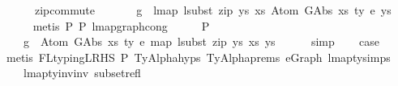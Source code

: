 \begin{isabellebody}
\ \ \ \ \ \ zip{\isacharunderscore}{\kern0pt}commute{\isacharparenright}{\kern0pt}\isanewline
\isanewline
\ \ \isamarkupfalse%
\isanewline
\ \ \ \ {\isachardoublequoteopen}g\ {\isasymsimeq}\ lmap\ {\isacharparenleft}{\kern0pt}lsubst\ {\isacharparenleft}{\kern0pt}zip\ ys{\isacharprime}{\kern0pt}\ xs{\isacharprime}{\kern0pt}{\isacharparenright}{\kern0pt}{\isacharparenright}{\kern0pt}\ {\isacharparenleft}{\kern0pt}Atom\ {\isacharparenleft}{\kern0pt}GAbs\ xs\ ty{}{\isacharprime}{\kern0pt}\ e{\isacharprime}{\kern0pt}{\isacharparenright}{\kern0pt}\ ys{\isacharparenright}{\kern0pt}{\isachardoublequoteclose}\isanewline
\ \ \ \ \isamarkupfalse%
\ {\isacharparenleft}{\kern0pt}metis\ P{}\ P{}\ lmap{\isacharunderscore}{\kern0pt}graph{\isacharunderscore}{\kern0pt}cong{\isacharparenright}{\kern0pt}\isanewline
\ \ \isamarkupfalse%
\ \isamarkupfalse%
\ P{}{\isacharcolon}{\kern0pt}\isanewline
\ \ \ \ {\isachardoublequoteopen}g\ {\isasymsimeq}\ Atom\ {\isacharparenleft}{\kern0pt}GAbs\ xs\ ty{}{\isacharprime}{\kern0pt}\ e{\isacharprime}{\kern0pt}{\isacharparenright}{\kern0pt}\ {\isacharparenleft}{\kern0pt}map\ {\isacharparenleft}{\kern0pt}lsubst\ {\isacharparenleft}{\kern0pt}zip\ ys{\isacharprime}{\kern0pt}\ xs{\isacharprime}{\kern0pt}{\isacharparenright}{\kern0pt}{\isacharparenright}{\kern0pt}\ ys{\isacharparenright}{\kern0pt}{\isachardoublequoteclose}\isanewline
\ \ \ \ \isamarkupfalse%
\ simp\isanewline
\isanewline
\ \ \isamarkupfalse%
\ {\isacharquery}{\kern0pt}case\isanewline
\ \ \isamarkupfalse%
\ {\isacharparenleft}{\kern0pt}metis\ FL{\isacharunderscore}{\kern0pt}typing{\isacharunderscore}{\kern0pt}LRHS\ P{}\ TyAlpha{\isachardot}{\kern0pt}hyps{\isacharparenleft}{\kern0pt}{}{\isacharcomma}{\kern0pt}{}{\isacharcomma}{\kern0pt}{}{\isacharcomma}{\kern0pt}{}{\isacharcomma}{\kern0pt}{}{\isacharcomma}{\kern0pt}{}{\isacharparenright}{\kern0pt}\ TyAlpha{\isachardot}{\kern0pt}prems{\isacharparenleft}{\kern0pt}{}{\isacharparenright}{\kern0pt}\ e{\isacharunderscore}{\kern0pt}Graph\ lmap{\isacharunderscore}{\kern0pt}ty{\isachardot}{\kern0pt}simps{\isacharparenleft}{\kern0pt}{}{\isacharparenright}{\kern0pt}\isanewline
\ \ \ \ lmap{\isacharunderscore}{\kern0pt}ty{\isacharunderscore}{\kern0pt}inv{\isacharunderscore}{\kern0pt}inv\ subset{\isacharunderscore}{\kern0pt}refl{\isacharparenright}{\kern0pt}\isanewline

\end{isabellebody}
